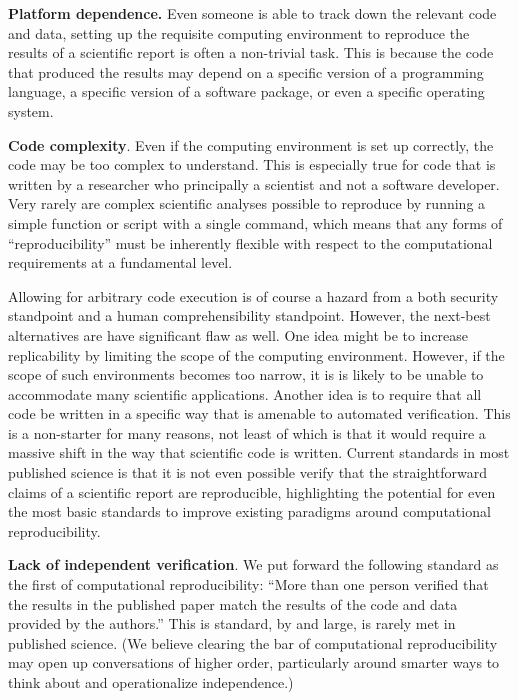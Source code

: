 \textbf{Platform dependence.} Even someone is able to track down the relevant code and data, setting up the requisite computing environment to reproduce the results of a scientific report is often a non-trivial task. This is because the code that produced the results may depend on a specific version of a programming language, a specific version of a software package, or even a specific operating system.

\textbf{Code complexity}. Even if the computing environment is set up correctly, the code may be too complex to understand. This is especially true for code that is written by a researcher who principally a scientist and not a software developer. Very rarely are complex scientific analyses possible to reproduce by running a simple function or script with a single command, which means that any forms of ``reproducibility'' must be inherently flexible with respect to the computational requirements at a fundamental level. 

Allowing for arbitrary code execution is of course a hazard from a both security standpoint and a human comprehensibility standpoint. However, the next-best alternatives are have significant flaw as well. One idea might be to increase replicability by limiting the scope of the computing environment. However, if the scope of such environments becomes too narrow, it is is likely to be unable to accommodate many scientific applications. 
Another idea is to require that all code be written in a specific way that is amenable to automated verification. This is a non-starter for many reasons, not least of which is that it would require a massive shift in the way that scientific code is written. 
Current standards in most published science is that it is not even possible verify that the straightforward claims of a scientific report are reproducible, highlighting the potential for even the most basic standards to improve existing paradigms around computational reproducibility. 

\textbf{Lack of independent verification}. We put forward the following standard as the first of computational reproducibility: ``More than one person verified that the results in the published paper match the results of the code and data provided by the authors.'' This is standard, by and large, is rarely met in published science. (We believe clearing the bar of computational reproducibility may open up conversations of higher order, particularly around smarter ways to think about and operationalize independence.)

